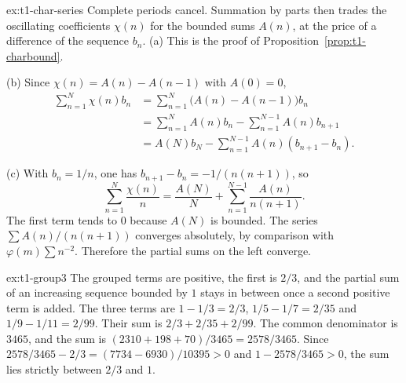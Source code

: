 \begin{solution}{ex:t1-char-series}
\idea Complete periods cancel. Summation by parts then trades the oscillating coefficients $\chi(n)$ for the bounded sums $A(n)$, at the price of a difference of the sequence $b_n$.
\writeup (a) This is the proof of Proposition~\ref{prop:t1-charbound}.

(b) Since $\chi(n)=A(n)-A(n-1)$ with $A(0)=0$,
\begin{align*}
\sum_{n=1}^N\chi(n)b_n
&=\sum_{n=1}^N\bigl(A(n)-A(n-1)\bigr)b_n\\
&=\sum_{n=1}^N A(n)b_n-\sum_{n=1}^{N-1}A(n)b_{n+1}\\
&=A(N)b_N-\sum_{n=1}^{N-1}A(n)(b_{n+1}-b_n).
\end{align*}

(c) With $b_n=1/n$, one has $b_{n+1}-b_n=-1/(n(n+1))$, so
\[
\sum_{n=1}^N\frac{\chi(n)}n=\frac{A(N)}N+\sum_{n=1}^{N-1}\frac{A(n)}{n(n+1)}.
\]
The first term tends to $0$ because $A(N)$ is bounded. The series $\sum A(n)/(n(n+1))$ converges absolutely, by comparison with $\varphi(m)\sum n^{-2}$. Therefore the partial sums on the left converge.
\end{solution}

\begin{solution}{ex:t1-group3}
\idea The grouped terms are positive, the first is $2/3$, and the partial sum of an increasing sequence bounded by $1$ stays in between once a second positive term is added.
\writeup The three terms are $1-1/3=2/3$, $1/5-1/7=2/35$ and $1/9-1/11=2/99$. Their sum is $2/3+2/35+2/99$. The common denominator is $3465$, and the sum is $(2310+198+70)/3465=2578/3465$. Since $2578/3465-2/3=(7734-6930)/10395>0$ and $1-2578/3465>0$, the sum lies strictly between $2/3$ and $1$.
\end{solution}

